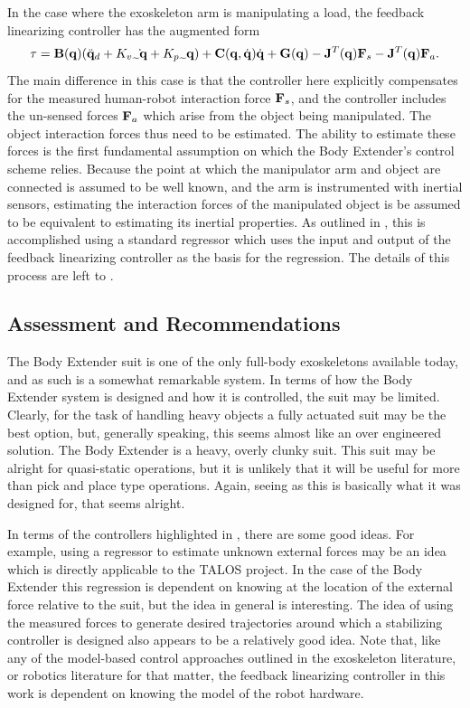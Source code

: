 In the case where the exoskeleton arm is manipulating a load, the feedback linearizing controller has the augmented form
\begin{equation}
{\bf \tau} = \mB(\vq)(\ddot{\vq}_d + K_v \dot{\tilde{\vq}} + K_p \tilde{\vq}) + \mC(\vq,\dot{\vq})\dot{\vq} + \mG(\vq) -\mJ^T(\vq) \vF_s -\mJ^T(\vq)\vF_a. \notag
\end{equation}
The main difference in this case is that the controller here explicitly compensates for the measured human-robot interaction force ${\bf F}_s$, and the controller includes the un-sensed forces ${\bf F}_a$ which arise from the object being manipulated.  The object interaction forces thus need to be estimated.  The ability to estimate these forces is the first fundamental assumption on which the Body Extender's control scheme relies.  Because the point at which the manipulator arm and object are connected is assumed to be well known, and the arm is instrumented with inertial sensors, estimating the interaction forces of the manipulated object is be assumed to be equivalent to estimating its inertial properties.  As outlined in \cite{}, this is accomplished using a standard regressor which uses the input and output of the feedback linearizing controller as the basis for the regression.  The details of this process are left to \cite{}.

 
\subsection{Assessment and Recommendations}

The Body Extender suit is one of the only full-body exoskeletons available today, and as such is a somewhat remarkable system. In terms of how the Body Extender system is designed and how it is controlled, the suit may be limited. Clearly, for the task of handling heavy objects a fully actuated suit may be the best option, but, generally speaking, this seems almost like an over engineered solution.  The Body Extender is a heavy, overly clunky suit.  This suit may be alright for quasi-static operations, but it is unlikely that it will be useful for more than pick and place type operations.  Again, seeing as this is basically what it was designed for, that seems alright.

In terms of the controllers highlighted in \cite{}, there are some good ideas.  For example, using a regressor to estimate unknown external forces may be an idea which is directly applicable to the TALOS project.  In the case of the Body Extender this regression is dependent on knowing at the location of the external force  relative to the suit, but the idea in general is interesting.  The idea of using the measured forces to generate desired trajectories around which a stabilizing controller is designed also appears to be a relatively good idea.  Note that, like any of the model-based control approaches outlined in the exoskeleton literature, or robotics literature for that matter, the feedback linearizing controller in this work is dependent on knowing the model of the robot hardware.  

